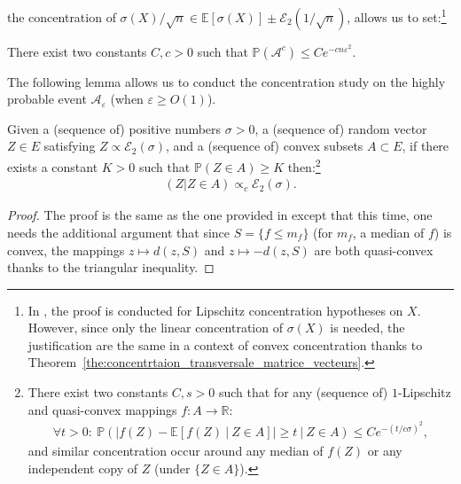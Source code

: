 \documentclass{ws-rmta}
\begin{document}
the concentration of $\sigma(X) / \sqrt n \in \mathbb E[\sigma(X)] \pm \mathcal E_2(1/\sqrt n)$, allows us to set:\footnote{In \cite{LOU21RHL}, the proof is conducted for Lipschitz concentration hypotheses on $X$. However, since only the linear concentration of $\sigma(X)$ is needed, the justification are the same in a context of convex concentration thanks to Theorem~\ref{the:concentrtaion_transversale_matrice_vecteurs}.}
\begin{lemma}\label{lem:P_A_overwhelming}
  There exist two constants $C,c>0$ such that $\mathbb P \left(\mathcal A^c\right) \leq C e^{-cn\varepsilon^2}$.
\end{lemma}
The following lemma allows us to conduct the concentration study on the highly probable event $\mathcal A_\varepsilon$ (when $\varepsilon \geq O(1)$).

\begin{lemma}\label{lem:concentration_conditionnee_convexe}
  Given a (sequence of) positive numbers $\sigma>0$, a (sequence of) random vector $Z\in E$ satisfying $Z \propto \mathcal E_2(\sigma)$, and a (sequence of) convex subsets $ A \subset E$, if there exists a constant $K>0$ such that $\mathbb P(Z \in  A)\geq K$ then:\footnote{There exist two constants $C,s>0$ such that for any (sequence of) $1$-Lipschitz and quasi-convex mappings $f:A\to \mathbb R$:
  \begin{align*}
    \forall t>0: \ \mathbb P \left(\left\vert f(Z) - \mathbb E[f(Z) \ | \ Z \in A]\right\vert \geq t \ | \ Z \in A \right) \leq C e^{-(t/c\sigma)^2},
  \end{align*}
  and similar concentration occur around any median of $f(Z)$ or any independent copy of $Z$ (under $\{Z \in A\}$).}
  \begin{align*}
     (Z | Z \in A) \propto_c \mathcal E_2(\sigma).
   \end{align*}
\end{lemma}
\begin{proof}
  The proof is the same as the one provided in \cite[Lemma 2.]{LOU21RHL} except that this time, one needs the additional argument that since $S = \{f \leq m_f\}$ (for $m_f$, a median of $f$) is convex, the mappings $z \mapsto d(z, S)$ and $z \mapsto -d(z, S)$ are both quasi-convex thanks to the triangular inequality.
\end{proof}
\end{document}
